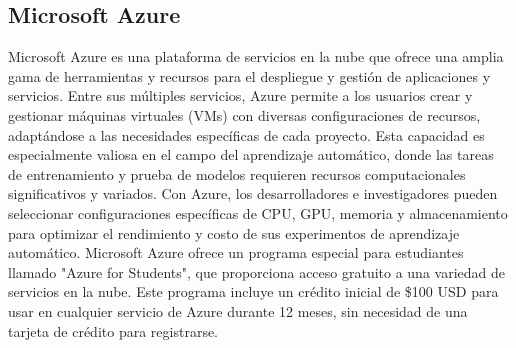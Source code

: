 \subsection{Microsoft Azure}
\label{subsec:azure}

Microsoft Azure es una plataforma de servicios en la nube que ofrece una amplia gama de herramientas y recursos para el despliegue y gestión de aplicaciones y servicios. Entre sus múltiples servicios, Azure permite a los usuarios crear y gestionar máquinas virtuales (VMs) con diversas configuraciones de recursos, adaptándose a las necesidades específicas de cada proyecto. Esta capacidad es especialmente valiosa en el campo del aprendizaje automático, donde las tareas de entrenamiento y prueba de modelos requieren recursos computacionales significativos y variados. Con Azure, los desarrolladores e investigadores pueden seleccionar configuraciones específicas de CPU, GPU, memoria y almacenamiento para optimizar el rendimiento y costo de sus experimentos de aprendizaje automático. Microsoft Azure ofrece un programa especial para estudiantes llamado "Azure for Students", que proporciona acceso gratuito a una variedad de servicios en la nube. Este programa incluye un crédito inicial de \$100 USD para usar en cualquier servicio de Azure durante 12 meses, sin necesidad de una tarjeta de crédito para registrarse. 






